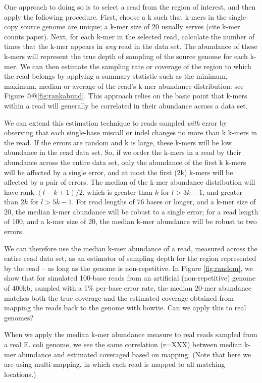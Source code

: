 \documentclass[10pt,draft]{article}
\begin{document}
One approach to doing so is to select a read from the region of
interest, and then apply the following procedure. First, choose a k
such that k-mers in the single-copy source genome are unique; a k-mer
size of 20 usually serves (cite k-mer counts paper).  Next, for each
k-mer in the selected read, calculate the number of times that the
k-mer appears in {\em any} read in the data set.  The abundance of
these k-mers will represent the true depth of sampling of the source
genome for each k-mer.  We can then estimate the sampling rate or
coverage of the region to which the read belongs by applying a summary
statistic such as the minimum, maximum, median or average of the
read's k-mer abundance distribution: see Figure @@\ref{fig:rankabund}. This approach
relies on the basic point that k-mers within a read will generally be
correlated in their abundance across a data set.

We can extend this estimation technique to reads sampled {\em with}
error by observing that each single-base miscall or indel changes no
more than k k-mers in the read.  If the errors are random and k is
large, these k-mers will be low abundance in the read data set.  So,
if we order the k-mers in a read by their abundance across the entire
data set, only the abundance of the first k k-mers will be affected by
a single error, and at most the first (2k) k-mers will be affected by
a pair of errors.  The median of the k-mer abundance distribution will
have rank $(l - k + 1) / 2$, which is greater than $k$ for $l > 3k-1$,
and greater than $2k$ for $l > 5k-1$.  For read lengths of 76
bases or longer, and a k-mer size of 20, the median k-mer abundance
will be robust to a single error; for a read length of 100, and a
k-mer size of 20, the median k-mer abundance will be robust to two
errors.

We can therefore use the median k-mer abundance of a read, measured
across the entire read data set, as an estimator of sampling depth for
the region represented by the read -- as long as the genome is
non-repetitive.  In Figure \ref{fig:random}, we show that for
simulated 100-base reads from an artificial (non-repetitive) genome of
400kb, sampled with a 1\% per-base error rate, the median 20-mer
abundance matches both the true coverage and the estimated coverage
obtained from mapping the reads back to the genome with bowtie.  Can
we apply this to real genomes?

When we apply the median k-mer abundance measure to real reads sampled
from a real E. coli genome, we see the same correlation (r=XXX)
between median k-mer abundance and estimated coveraged based on mapping.
(Note that here we are using multi-mapping, in which each read is mapped
to all matching locations.)
\end{document}

